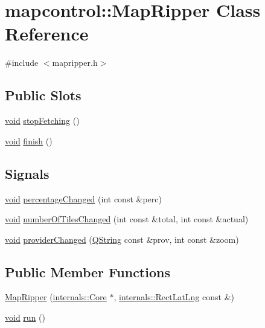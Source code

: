 \hypertarget{classmapcontrol_1_1_map_ripper}{\section{mapcontrol\-:\-:\-Map\-Ripper \-Class \-Reference}
\label{classmapcontrol_1_1_map_ripper}
}


{\ttfamily \#include $<$mapripper.\-h$>$}

\subsection*{\-Public \-Slots}
\begin{DoxyCompactItemize}
\item 
\hyperlink{group___u_a_v_objects_plugin_ga444cf2ff3f0ecbe028adce838d373f5c}{void} \hyperlink{group___o_p_map_widget_ga0419a5b1b5c4fef8c6344c8a29320cb7}{stop\-Fetching} ()
\item 
\hyperlink{group___u_a_v_objects_plugin_ga444cf2ff3f0ecbe028adce838d373f5c}{void} \hyperlink{group___o_p_map_widget_ga137eaecaa016ae12f23b3638657fe797}{finish} ()
\end{DoxyCompactItemize}
\subsection*{\-Signals}
\begin{DoxyCompactItemize}
\item 
\hyperlink{group___u_a_v_objects_plugin_ga444cf2ff3f0ecbe028adce838d373f5c}{void} \hyperlink{group___o_p_map_widget_ga49c16d8dabea46c8afafb51521e2428b}{percentage\-Changed} (int const \&perc)
\item 
\hyperlink{group___u_a_v_objects_plugin_ga444cf2ff3f0ecbe028adce838d373f5c}{void} \hyperlink{group___o_p_map_widget_ga5e1cd3587aa324cbf448b05771ef51c8}{number\-Of\-Tiles\-Changed} (int const \&total, int const \&actual)
\item 
\hyperlink{group___u_a_v_objects_plugin_ga444cf2ff3f0ecbe028adce838d373f5c}{void} \hyperlink{group___o_p_map_widget_ga19cc407500250e1c43e975e30ea90112}{provider\-Changed} (\hyperlink{group___u_a_v_objects_plugin_gab9d252f49c333c94a72f97ce3105a32d}{\-Q\-String} const \&prov, int const \&zoom)
\end{DoxyCompactItemize}
\subsection*{\-Public \-Member \-Functions}
\begin{DoxyCompactItemize}
\item 
\hyperlink{group___o_p_map_widget_ga8c3645377b4deb3dc4d498de823ff3fd}{\-Map\-Ripper} (\hyperlink{classinternals_1_1_core}{internals\-::\-Core} $\ast$, \hyperlink{structinternals_1_1_rect_lat_lng}{internals\-::\-Rect\-Lat\-Lng} const \&)
\item 
\hyperlink{group___u_a_v_objects_plugin_ga444cf2ff3f0ecbe028adce838d373f5c}{void} \hyperlink{group___o_p_map_widget_gab955ee8425cb4937440d817492b47a88}{run} ()
\end{DoxyCompactItemize}


